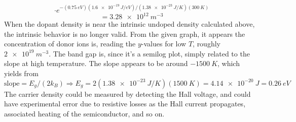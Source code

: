 \documentclass{article}
\begin{document}
\[
  \cdot e^{-(\SI{0.75}{eV})(\SI{1.6e-19}{J/eV})/(\SI{1.38e-23}{J/K})(\SI{300}{K})}
\]
\[
  =\SI{3.28e12}{m^{-3}}
\]
When the dopant density is near the intrinsic undoped density calculated above, the intrinsic behavior is no longer valid.
From the given graph, it appears the concentration of donor ions is, reading the $y$-values for low $T$, roughly $\SI{2e19}{m^{-3}}$.
The band gap is, since it's a semilog plot, simply related to the slope at high temperature.
The slope appears to be around $\SI{-1500}{K}$, which yields from
\[
  \textrm{slope}=E_{g}/(2k_{B})\Rightarrow E_{g}=2(\SI{1.38e-23}{J/K})(\SI{1500}{K})=\SI{4.14e-20}{J}=\SI{0.26}{eV}
\]
The carrier density could be measured by detecting the Hall voltage, and could have experimental error due to resistive losses as the
Hall current propagates, associated heating of the semiconductor, and so on.
\end{document}
